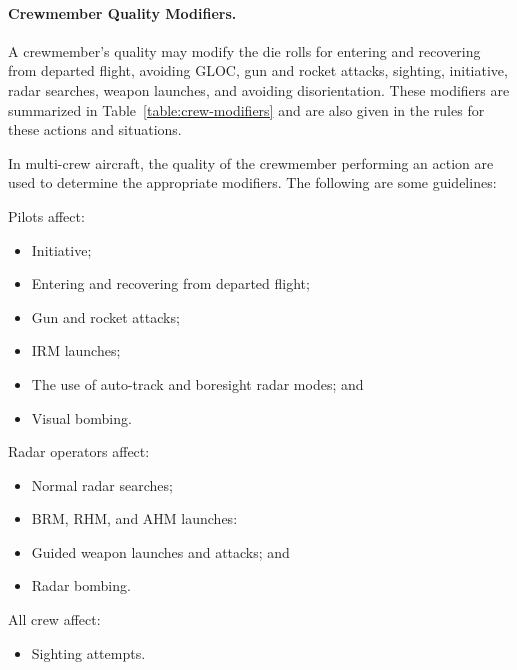 \begin{advancedrules}
{

\paragraph{Crewmember Quality Modifiers.} A crewmember's quality may modify the die rolls for entering and recovering from departed flight, avoiding GLOC, gun and rocket attacks, sighting, initiative, radar searches, weapon launches, and avoiding disorientation. These modifiers are summarized in Table~\ref{table:crew-modifiers} and are also given in the rules for these actions and situations. 

In multi-crew aircraft, the quality of the crewmember performing an action are used to determine the appropriate modifiers. The following are some guidelines:

Pilots affect:
\begin{itemize}
    \item Initiative;
    \item Entering and recovering from departed flight;
    \item Gun and rocket attacks;
    \item IRM launches;
    \item The use of auto-track and boresight radar modes; and
    \item Visual bombing.
\end{itemize}

Radar operators affect:
\begin{itemize}
    \item Normal radar searches;
    \item BRM, RHM, and AHM launches:
    \item Guided weapon launches and attacks; and
    \item Radar bombing.
\end{itemize}

All crew affect:
\begin{itemize}
    \item Sighting attempts.
\end{itemize}
}

\end{advancedrules}
